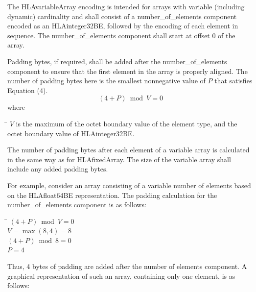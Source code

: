 \par{}\par\vspace{1pt}
The HLAvariableArray encoding is intended for arrays with variable (including dynamic) cardinality and shall consist of a number\_of\_elements component encoded as an HLAinteger32BE, followed by the encoding of each element in sequence. The number\_of\_elements component shall start at offset 0 of the array.

Padding bytes, if required, shall be added after the number\_of\_elements component to ensure that the first element in the array is properly aligned. The number of padding bytes here is the smallest nonnegative value of $P$ that satisfies Equation (4).
\begin{equation}
    (4 + P) \bmod V = 0
\end{equation}
where

\begin{tabbing}
    \hspace{18pt}\=\kill
    $V$ \> is the maximum of the octet boundary value of the element type, and the octet boundary value of HLAinteger32BE.
\end{tabbing}

The number of padding bytes after each element of a variable array is calculated in the same way as for HLAfixedArray. The size of the variable array shall include any added padding bytes.

For example, consider an array consisting of a variable number of elements based on the HLAfloat64BE representation. The padding calculation for the number\_of\_elements component is as follows:

\begin{tabbing}
    \hspace{18pt}\=\kill
    \> $(4+P) \bmod V = 0$\\
    \> $V = \max(8,4) = 8$\\
    \> $(4+P) \bmod 8 = 0$\\
    \> $P=4$
\end{tabbing}

\newpage
Thus, 4 bytes of padding are added after the number of elements component. A graphical representation of such an array, containing only one element, is as follows:

